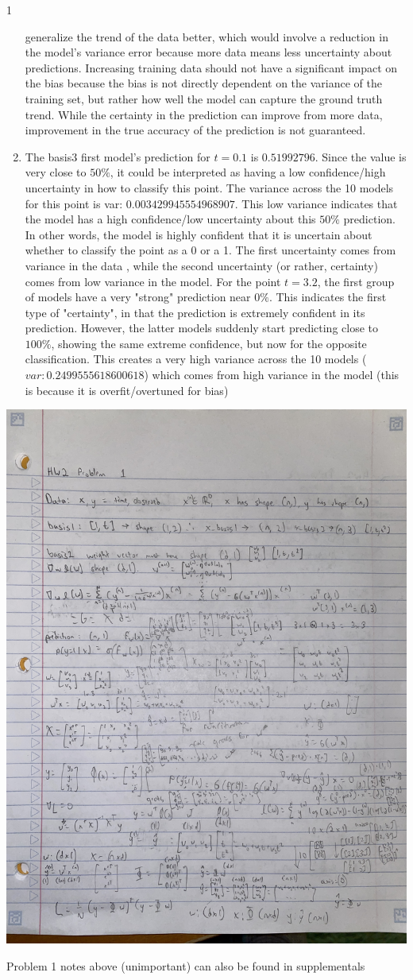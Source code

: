 \documentclass[submit]{harvardml}
\begin{document}
\begin{sol}{}{1}
\begin{enumerate}
    generalize the trend of the data better, which would involve
    a reduction in the model's variance error because more data means
    less uncertainty about predictions. Increasing training data should not have a significant impact
    on the bias because the bias is not directly dependent on the variance
    of the training set, but rather how well the model can capture
    the ground truth trend. While the certainty in the prediction
    can improve from more data, improvement in the true accuracy 
    of the prediction is not guaranteed.
    \item The basis3 first model's prediction for $t = 0.1$ is $0.51992796$. Since
    the value is very close to $50\%$, it could be interpreted as
    having a low confidence/high uncertainty in how to classify this point.
    The variance across the 10 models for this point is var: $0.003429945554968907$.
    This low variance indicates that the model has a high confidence/low uncertainty
    about this $50\%$ prediction. In other words, the model is highly confident
    that it is uncertain about whether to classify the point as a 0 or a 1.
    The first uncertainty comes from variance in the data , while
    the second uncertainty (or rather, certainty) comes from low variance in the model.
    For the point $t = 3.2$, the first group of models have a very "strong"
    prediction near $0\%$. This indicates the first type of "certainty", in that
    the prediction is extremely confident in its prediction. 
    However, the latter models suddenly start predicting close to $100\%$,
    showing the same extreme confidence, but now for the opposite classification.
    This creates a very high variance across the 10 models ($var: 0.2499555618600618$)
    which comes from high variance in the model (this is because it is overfit/overtuned for bias)
  \end{enumerate}

  \includegraphics[angle=270,width=0.1\linewidth]{images/Problem_1.JPG}
  
  Problem 1 notes above (unimportant) can also be found in supplementals
\end{sol}
\end{document}
